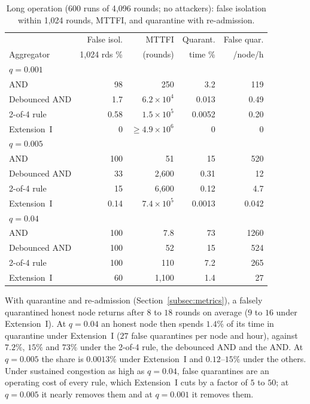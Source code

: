 \documentclass[lineno,pdflatex,sn-nature]{sn-jnl}
\theoremstyle{thmstyleone}%
\theoremstyle{thmstylethree}%
\begin{document}
\begin{table}[!t]
\caption{Long operation (600 runs of 4{,}096 rounds; no attackers): false isolation within 1{,}024 rounds, MTTFI, and quarantine with re-admission.}
\label{tab:long}
\centering
\renewcommand{\arraystretch}{1.08}
\footnotesize
\setlength{\tabcolsep}{2.4pt}
\begin{tabular}{lrrrr}
\toprule
 & {False isol.} & {MTTFI} & {Quarant.} & {False quar.} \\
{Aggregator} & {1{,}024 rds \%} & {(rounds)} & {time \%} & {/node/h} \\
\midrule
\multicolumn{5}{l}{$q=0.001$} \\
AND~\cite{soula2024iodt} & 98 & 250 & 3.2 & 119 \\
Debounced AND & 1.7 & $6.2\times10^{4}$ & 0.013 & 0.49 \\
2-of-4 rule & 0.58 & $1.5\times10^{5}$ & 0.0052 & 0.20 \\
{Extension~I} & 0 & $\geq$$4.9\times10^{6}$ & 0 & 0 \\
\midrule
\multicolumn{5}{l}{$q=0.005$} \\
AND~\cite{soula2024iodt} & 100 & 51 & 15 & 520 \\
Debounced AND & 33 & 2{,}600 & 0.31 & 12 \\
2-of-4 rule & 15 & 6{,}600 & 0.12 & 4.7 \\
{Extension~I} & 0.14 & $7.4\times10^{5}$ & 0.0013 & 0.042 \\
\midrule
\multicolumn{5}{l}{$q=0.04$} \\
AND~\cite{soula2024iodt} & 100 & 7.8 & 73 & 1260 \\
Debounced AND & 100 & 52 & 15 & 524 \\
2-of-4 rule & 100 & 110 & 7.2 & 265 \\
{Extension~I} & 60 & 1{,}100 & 1.4 & 27 \\
\bottomrule
\end{tabular}
\end{table}

With quarantine and re-admission (Section~\ref{subsec:metrics}), a
falsely quarantined honest node returns after $8$ to $18$ rounds on
average ($9$ to $16$ under Extension~I).  At $q=0.04$ an honest node
then spends $1.4\%$ of its time in quarantine under Extension~I ($27$
false quarantines per node and hour), against $7.2\%$, $15\%$ and $73\%$
under the 2-of-4 rule, the debounced AND and the AND.  At $q=0.005$ the
share is $0.0013\%$ under Extension~I and $0.12$--$15\%$ under the
others.  Under sustained congestion as high as $q=0.04$, false
quarantines are an operating cost of every rule, which Extension~I cuts
by a factor of $5$ to $50$; at $q=0.005$ it nearly removes them and at $q=0.001$ it removes them.
\end{document}
